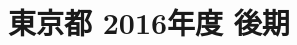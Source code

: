 \documentclass[../../hsm_tok_q.tex]{subfiles}
\begin{document}
    \section{東京都 2016年度 後期}
    \subsection{　}
    
    \newpage
    \subsection{　}
    
    \newpage
    \subsection{　}
    
    \newpage
    \subsection{　}
    
    \newpage
    \subsection{　}
    
\end{document}
